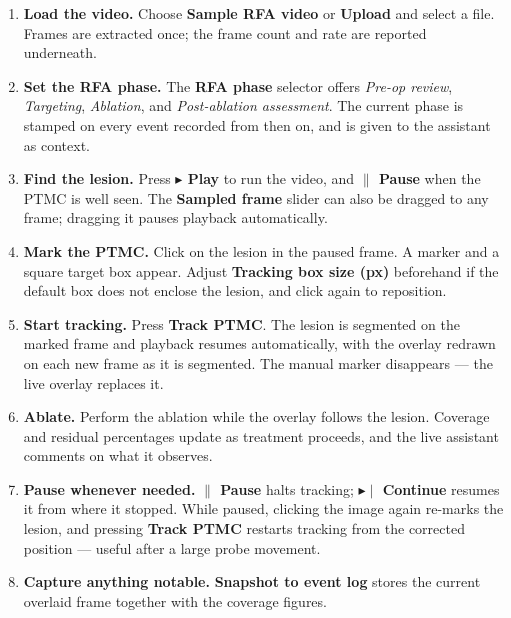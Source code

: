\documentclass[11pt,a4paper]{article}
\newcommand{\ui}[1]{\textbf{#1}}
\begin{document}
\begin{enumerate}[leftmargin=1.6em]
  \item \textbf{Load the video.} Choose \ui{Sample RFA video} or \ui{Upload}
  and select a file. Frames are extracted once; the frame count and rate are
  reported underneath.

  \item \textbf{Set the RFA phase.} The \ui{RFA phase} selector offers
  \emph{Pre-op review}, \emph{Targeting}, \emph{Ablation}, and
  \emph{Post-ablation assessment}. The current phase is stamped on every event
  recorded from then on, and is given to the assistant as context.

  \item \textbf{Find the lesion.} Press \ui{$\blacktriangleright$ Play} to run
  the video, and \ui{$\parallel$ Pause} when the PTMC is well seen. The
  \ui{Sampled frame} slider can also be dragged to any frame; dragging it
  pauses playback automatically.

  \item \textbf{Mark the PTMC.} Click on the lesion in the paused frame. A
  marker and a square target box appear. Adjust \ui{Tracking box size (px)}
  beforehand if the default box does not enclose the lesion, and click again
  to reposition.

  \item \textbf{Start tracking.} Press \ui{Track PTMC}. The lesion is
  segmented on the marked frame and playback resumes automatically, with the
  overlay redrawn on each new frame as it is segmented. The manual marker
  disappears --- the live overlay replaces it.

  \item \textbf{Ablate.} Perform the ablation while the overlay follows the
  lesion. Coverage and residual percentages update as treatment proceeds, and
  the live assistant comments on what it observes.

  \item \textbf{Pause whenever needed.} \ui{$\parallel$ Pause} halts tracking;
  \ui{$\blacktriangleright\!\!\mid$ Continue} resumes it from where it
  stopped. While paused, clicking the image again re-marks the lesion, and
  pressing \ui{Track PTMC} restarts tracking from the corrected position ---
  useful after a large probe movement.

  \item \textbf{Capture anything notable.} \ui{Snapshot to event log} stores
  the current overlaid frame together with the coverage figures.
\end{enumerate}
\end{document}
